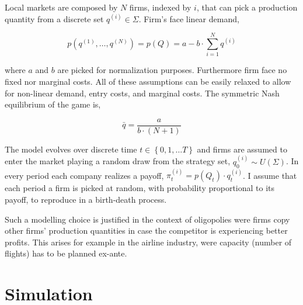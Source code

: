\documentclass[american]{scrartcl}
\newcommand{\set}[1]{\left\{#1\right\}}
\begin{document}
Local markets are composed by $N$ firms, indexed by $i$, that can pick a production quantity from a discrete set $q^{(i)} \in \Sigma$. Firm's face linear demand,

\begin{equation}
    p(q^{(1)}, \ldots, q^{(N)}) = p(Q)= a - b \cdot \sum^{N}_{i=1} q^{(i)}
\end{equation}

where $a$ and $b$ are picked for normalization purposes. Furthermore firm face no fixed nor marginal costs. All of these assumptions can be easily relaxed to allow for non-linear demand, entry costs, and marginal costs. The symmetric Nash equilibrium of the game is,

\begin{equation}
    \bar{q}= \frac{a}{b \cdot (N+1)}
\end{equation}



The model evolves over discrete time $t \in \set{0, 1, \ldots T}$ and firms are assumed to enter the market playing a random draw from the strategy set,  $q^{(i)}_0 \sim U(\Sigma)$. In every period each company realizes a payoff, $\pi^{(i)}_t = p(Q_t) \cdot q^{(i)}_t$. I assume that each period a firm is picked at random, with probability proportional to its payoff, to reproduce in a birth-death process.

Such a modelling choice is justified in the context of oligopolies were firms copy other firms' production quantities in case the competitor is experiencing better profits. This arises for example in the airline industry, were capacity (number of flights) has to be planned ex-ante.

\iffalse
    Assume only one player is playing the equilibrium strategy $\bar{q}$. Such that,

    \begin{equation}
        Q_t = \set{q^{(1)}, q^{(2)}, \ldots, \bar{q}, \ldots, q^{(N)}}.
    \end{equation}

    The probability of that strategy being picked for reproduction is then,

    \begin{equation}
        \frac{\exp(P(Q_t) \cdot \bar{q})}{\sum_{i} \exp(P(Q_t) \cdot q_i)}
    \end{equation}

\fi

\section{Simulation}
\end{document}
